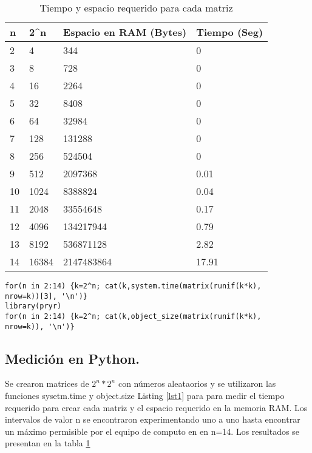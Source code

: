 \documentclass{article}
\begin{document}
\begin{table}[h]
\centering
\begin{tabular}{|l|l|l|l|}
\hline
n  & 2\textasciicircum{}n & Espacio en RAM (Bytes) & Tiempo (Seg) \\ \hline
2  & 4                    & 344                    & 0            \\ \hline
3  & 8                    & 728                    & 0            \\ \hline
4  & 16                   & 2264                   & 0            \\ \hline
5  & 32                   & 8408                   & 0            \\ \hline
6  & 64                   & 32984                  & 0            \\ \hline
7  & 128                  & 131288                 & 0            \\ \hline
8  & 256                  & 524504                 & 0            \\ \hline
9  & 512                  & 2097368                & 0.01         \\ \hline
10 & 1024                 & 8388824                & 0.04         \\ \hline
11 & 2048                 & 33554648               & 0.17         \\ \hline
12 & 4096                 & 134217944              & 0.79         \\ \hline
13 & 8192                 & 536871128              & 2.82         \\ \hline
14 & 16384                & 2147483864             & 17.91        \\ \hline
\end{tabular}
\caption{Tiempo y espacio requerido para cada matriz}
\label{tabla 1}
\end{table}

\lstset{language=Python}
\lstset{frame=lines}
\lstset{basicstyle=\footnotesize}
\begin{lstlisting}
for(n in 2:14) {k=2^n; cat(k,system.time(matrix(runif(k*k),
nrow=k))[3], '\n')}
library(pryr)
for(n in 2:14) {k=2^n; cat(k,object_size(matrix(runif(k*k),
nrow=k)), '\n')}
\end{lstlisting}


\subsection{Medición en Python.} 
Se crearon matrices de $2^n * 2^n$ con números aleataorios y se utilizaron las funciones sysetm.time y object.size Listing \ref{lst1} para para medir el tiempo requerido para crear cada matriz y el espacio requerido en la memoria RAM. Los intervalos de valor n se encontraron experimentando uno a uno hasta encontrar un máximo permisible por el equipo de computo en en n=14. Los resultados se presentan en la tabla \ref{tabla 1}
\end{document}
